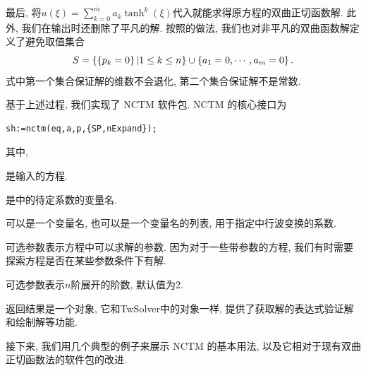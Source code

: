 最后, 将$u(\xi)=\sum_{k=0}^{\overline{m}}{a_k \tanh^k(\xi)}$代入就能求得原方程的双曲正切函数解.  此外, 我们在输出时还删除了平凡的解. 按照的做法, 我们也对非平凡的双曲函数解定义了避免取值集合
\begin{equation}
    S=\left\{\left\{p_k=0\right\}|1\le k \le n\right\} \cup \left\{a_1=0,\cdots,a_m=0\right\}.
\end{equation}
式中第一个集合保证解的维数不会退化, 第二个集合保证解不是常数. 

基于上述过程, 我们实现了 NCTM 软件包. NCTM 的核心接口为
\begin{verbatim}
sh:=nctm(eq,a,p,{SP,nExpand});
\end{verbatim}
其中,
\begin{compactitem}[\textbullet]
\item {} 是输入的方程.
\item {} 是中的待定系数的变量名.
\item {} 可以是一个变量名, 也可以是一个变量名的列表, 用于指定中行波变换的系数.
\item 可选参数表示方程中可以求解的参数. 因为对于一些带参数的方程, 我们有时需要探索方程是否在某些参数条件下有解.
\item 可选参数表示$n$阶展开的阶数, 默认值为2.
\item 返回结果是一个对象, 它和TwSolver中的对象一样, 提供了获取解的表达式\D 验证解和绘制解等功能. 
\end{compactitem}

接下来, 我们用几个典型的例子来展示 NCTM 的基本用法, 以及它相对于现有双曲正切函数法的软件包的改进. 

